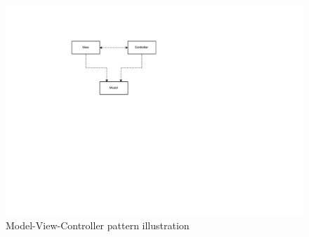 \begin{figure}[H]
\centering
\includegraphics[scale=0.8]{4-analysis/images/analysis-mvc.pdf}
\caption{Model-View-Controller pattern illustration \cite{Fowler:2002:PEA:579257}}
\label{fig:analysis-mvc}
\end{figure}

